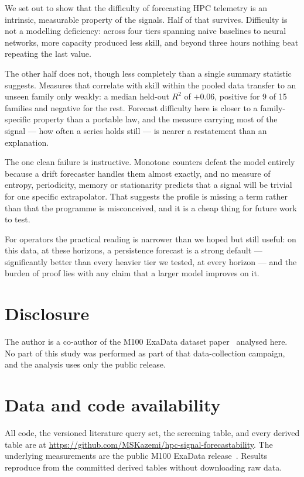 \documentclass[11pt,a4paper]{article}
\newcommand{\num}[1]{#1}
\begin{document}
We set out to show that the difficulty of forecasting HPC telemetry is an
intrinsic, measurable property of the signals. Half of that survives. Difficulty
is not a modelling deficiency: across four tiers spanning naive baselines to
neural networks, more capacity produced less skill, and beyond three hours
nothing beat repeating the last value.

The other half does not, though less completely than a single summary statistic
suggests. Measures that correlate with skill within the pooled data transfer to
an unseen family only weakly: a median held-out \(R^2\) of \(+0.06\), positive
for \num{9} of \num{15} families and negative for the rest. Forecast difficulty
here is closer to a family-specific property than a portable law, and the
measure carrying most of the signal --- how often a series holds still --- is
nearer a restatement than an explanation.

The one clean failure is instructive. Monotone counters defeat the model
entirely because a drift forecaster handles them almost exactly, and no measure
of entropy, periodicity, memory or stationarity predicts that a signal will be
trivial for one specific extrapolator. That suggests the profile is missing a
term rather than that the programme is misconceived, and it is a cheap thing for
future work to test.

For operators the practical reading is narrower than we hoped but still useful:
on this data, at these horizons, a persistence forecast is a strong default ---
significantly better than every heavier tier we tested, at every horizon --- and
the burden of proof lies with any claim that a larger model improves on it.

\section*{Disclosure}

The author is a co-author of the M100 ExaData dataset paper~\citep{borghesi2023m100}
analysed here. No part of this study was performed as part of that data-collection
campaign, and the analysis uses only the public release.

\section*{Data and code availability}

All code, the versioned literature query set, the screening table, and every
derived table are at
\url{https://github.com/MSKazemi/hpc-signal-forecastability}. The underlying
measurements are the public M100 ExaData release~\citep{borghesi2023m100}.
Results reproduce from the committed derived tables without downloading raw
data.



\end{document}

